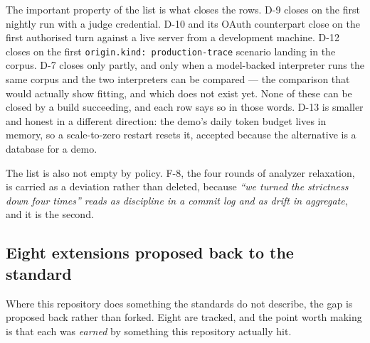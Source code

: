 \documentclass[11pt,a4paper]{article}
\begin{document}
The important property of the list is what closes the rows. D-9 closes on the
first nightly run with a judge credential. D-10 and its OAuth counterpart close
on the first authorised turn against a live server from a development machine.
D-12 closes on the first \texttt{origin.kind: production-trace} scenario landing
in the corpus. D-7 closes only partly, and only when a model-backed interpreter
runs the same corpus and the two interpreters can be compared --- the comparison
that would actually show fitting, and which does not exist yet. None of these
can be closed by a build succeeding, and each row says so in those words. D-13
is smaller and honest in a different direction: the demo's daily token budget
lives in memory, so a scale-to-zero restart resets it, accepted because the
alternative is a database for a demo.

The list is also not empty by policy. F-8, the four rounds of analyzer
relaxation, is carried as a deviation rather than deleted, because \emph{``we
turned the strictness down four times'' reads as discipline in a commit log and
as drift in aggregate}, and it is the second.

\subsection{Eight extensions proposed back to the standard}

Where this repository does something the standards do not describe, the gap is
proposed back rather than forked. Eight are tracked, and the point worth making
is that each was \emph{earned} by something this repository actually hit.
\end{document}
